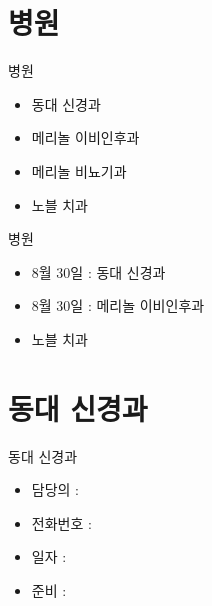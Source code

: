 \documentclass[aspectratio=1610,17pt,xcolor=pdftex,dvipsnames,table,handout]{beamer}
\begin{document}
		\section{병원}
		

		\begin{frame} [t,plain]
			\begin{block} {병원}
			\begin{itemize}
					\item 동대 신경과
					\item 메리놀 이비인후과
					\item 메리놀 비뇨기과
					\item 노블 치과
			\end{itemize}
			\end{block}
		\end{frame}

		\begin{frame} [t,plain]
			\begin{block} {병원}
			\begin{itemize}
					\item 8월 30일 : 동대 신경과
					\item 8월 30일 : 메리놀 이비인후과
					\item 노블 치과
			\end{itemize}
			\end{block}
		\end{frame}


		\section{동대 신경과}
		

		\begin{frame} [t,plain]
			\begin{block} {동대 신경과}
			\begin{itemize}
					\item 담당의 : 
					\item 전화번호 : 
					\item 일자 : 
					\item 준비 :
			\end{itemize}
			\end{block}
		\end{frame}
\end{document}
